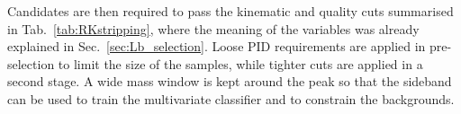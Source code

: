 Candidates are then required to pass the kinematic and quality cuts summarised in Tab.~\ref{tab:RKstripping},
where the meaning of the variables was already explained in Sec.~\ref{sec:Lb_selection}.
Loose PID requirements are applied in pre-selection to limit the size of the samples, while tighter cuts 
are applied in a second stage. A wide mass window is kept around the \Bz peak so that
 the sideband can be used to train the multivariate classifier and to constrain the backgrounds.
%
%
